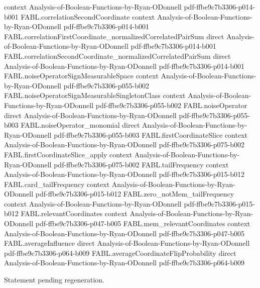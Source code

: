 \begin{theorem}
  {context}
  {Analysis-of-Boolean-Functions-by-Ryan-ODonnell}
  {pdf-ffbe9c7b3306-p014-b001}
\proofstep
  {FABL.correlationSecondCoordinate}
  {context}
  {Analysis-of-Boolean-Functions-by-Ryan-ODonnell}
  {pdf-ffbe9c7b3306-p014-b001}
\proofstep
  {FABL.correlationFirstCoordinate_normalizedCorrelatedPairSum}
  {direct}
  {Analysis-of-Boolean-Functions-by-Ryan-ODonnell}
  {pdf-ffbe9c7b3306-p014-b001}
\proofstep
  {FABL.correlationSecondCoordinate_normalizedCorrelatedPairSum}
  {direct}
  {Analysis-of-Boolean-Functions-by-Ryan-ODonnell}
  {pdf-ffbe9c7b3306-p014-b001}
\proofstep
  {FABL.noiseOperatorSignMeasurableSpace}
  {context}
  {Analysis-of-Boolean-Functions-by-Ryan-ODonnell}
  {pdf-ffbe9c7b3306-p055-b002}
\proofstep
  {FABL.noiseOperatorSignMeasurableSingletonClass}
  {context}
  {Analysis-of-Boolean-Functions-by-Ryan-ODonnell}
  {pdf-ffbe9c7b3306-p055-b002}
\proofstep
  {FABL.noiseOperator}
  {direct}
  {Analysis-of-Boolean-Functions-by-Ryan-ODonnell}
  {pdf-ffbe9c7b3306-p055-b003}
\proofstep
  {FABL.noiseOperator_monomial}
  {direct}
  {Analysis-of-Boolean-Functions-by-Ryan-ODonnell}
  {pdf-ffbe9c7b3306-p055-b003}
\proofstep
  {FABL.firstCoordinateSlice}
  {context}
  {Analysis-of-Boolean-Functions-by-Ryan-ODonnell}
  {pdf-ffbe9c7b3306-p075-b002}
\proofstep
  {FABL.firstCoordinateSlice_apply}
  {context}
  {Analysis-of-Boolean-Functions-by-Ryan-ODonnell}
  {pdf-ffbe9c7b3306-p075-b002}
\proofstep
  {FABL.tailFrequency}
  {context}
  {Analysis-of-Boolean-Functions-by-Ryan-ODonnell}
  {pdf-ffbe9c7b3306-p015-b012}
\proofstep
  {FABL.card_tailFrequency}
  {context}
  {Analysis-of-Boolean-Functions-by-Ryan-ODonnell}
  {pdf-ffbe9c7b3306-p015-b012}
\proofstep
  {FABL.zero_notMem_tailFrequency}
  {context}
  {Analysis-of-Boolean-Functions-by-Ryan-ODonnell}
  {pdf-ffbe9c7b3306-p015-b012}
\proofstep
  {FABL.relevantCoordinates}
  {context}
  {Analysis-of-Boolean-Functions-by-Ryan-ODonnell}
  {pdf-ffbe9c7b3306-p047-b005}
\proofstep
  {FABL.mem_relevantCoordinates}
  {context}
  {Analysis-of-Boolean-Functions-by-Ryan-ODonnell}
  {pdf-ffbe9c7b3306-p047-b005}
\proofstep
  {FABL.averageInfluence}
  {direct}
  {Analysis-of-Boolean-Functions-by-Ryan-ODonnell}
  {pdf-ffbe9c7b3306-p064-b009}
\proofstep
  {FABL.averageCoordinateFlipProbability}
  {direct}
  {Analysis-of-Boolean-Functions-by-Ryan-ODonnell}
  {pdf-ffbe9c7b3306-p064-b009}

Statement pending regeneration.
\end{theorem}

